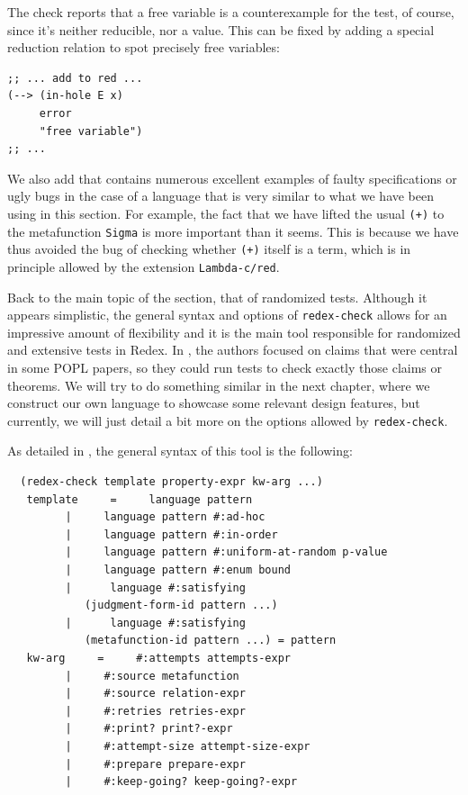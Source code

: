 The check reports that a free variable is a counterexample for the test,
of course, since it's neither reducible, nor a value. This can be fixed
by adding a special reduction relation to spot precisely free variables:
{
  \small
\begin{verbatim}
;; ... add to red ...
(--> (in-hole E x)
     error
     "free variable")
;; ...
\end{verbatim}
}

We also add that \cite{randomplt} contains numerous excellent examples of
faulty specifications or ugly bugs in the case of a language that is very
similar to what we have been using in this section. For example, the fact
that we have lifted the usual \texttt{(+)} to the metafunction \texttt{Sigma}
is more important than it seems. This is because we have thus avoided
the bug of checking whether \texttt{(+)} itself is a term, which is in
principle allowed by the extension \texttt{Lambda-c/red}.

\vspace{0.3cm}

Back to the main topic of the section, that of randomized tests. Although
it appears simplistic, the general syntax and options of \texttt{redex-check}
allows for an impressive amount of flexibility and it is the main tool
responsible for randomized and extensive tests in Redex. In \cite{popl},
the authors focused on claims that were central in some POPL papers, so
they could run tests to check exactly those claims or theorems.
{\color{red} We will try to do something similar in the next chapter,
  where we construct our own language to showcase some relevant design
  features,} but currently, we will just detail a bit more on the options
allowed by \texttt{redex-check}.

As detailed in \cite{redex-check}, the general syntax of this tool is the
following:
{
  \small
\begin{verbatim}
  (redex-check template property-expr kw-arg ...)  
   template     =     language pattern    
         |     language pattern #:ad-hoc    
         |     language pattern #:in-order    
         |     language pattern #:uniform-at-random p-value    
         |     language pattern #:enum bound    
         |      language #:satisfying      
            (judgment-form-id pattern ...)      
         |      language #:satisfying      
            (metafunction-id pattern ...) = pattern      
   kw-arg     =     #:attempts attempts-expr    
         |     #:source metafunction    
         |     #:source relation-expr    
         |     #:retries retries-expr    
         |     #:print? print?-expr    
         |     #:attempt-size attempt-size-expr    
         |     #:prepare prepare-expr    
         |     #:keep-going? keep-going?-expr    
\end{verbatim}
}

